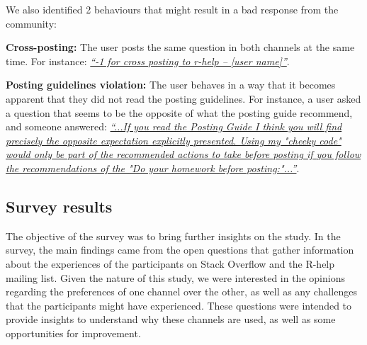     We also identified 2 behaviours that might result in a bad response from the community:
    \begin{packed_enum}
        \item \textbf{Cross-posting:} The user posts the same question in both channels at the same time.
        For instance: \textit{\href{http://goo.gl/ENKrVK}{``-1 for cross posting to r-help – [user name]''}}.
        \item \textbf{Posting guidelines violation:} The user behaves in a way that it becomes apparent that they did not read the posting guidelines.
        For instance, a user asked a question that seems to be the opposite of what the posting guide recommend, and someone answered: \textit{\href{http://goo.gl/FUm1HC}{``...If you read the Posting Guide I think you will find precisely the opposite expectation explicitly presented. Using my "cheeky code" would only be part of the recommended actions to take before posting if you follow the recommendations of the "Do your homework before posting:"...''}}.
    \end{packed_enum}

\subsection{Survey results}
\label{sec:survey}

The objective of the survey was to bring further insights on the study.
In the survey, the main findings came from the open questions that gather information about the experiences of the participants on Stack Overflow and the R-help mailing list.
Given the nature of this study, we were interested in the opinions regarding the preferences of one channel over the other, as well as any challenges that the participants might have experienced.
These questions were intended to provide insights to understand why these channels are used, as well as some opportunities for improvement.


